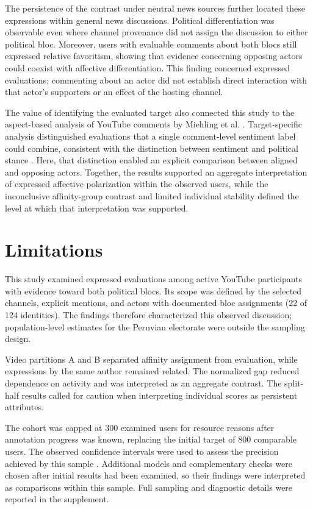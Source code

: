 \documentclass[conference,letterpaper]{IEEEtran}
\begin{document}
The persistence of the contrast under neutral news sources further located these expressions within general news discussions. Political differentiation was observable even where channel provenance did not assign the discussion to either political bloc. Moreover, users with evaluable comments about both blocs still expressed relative favoritism, showing that evidence concerning opposing actors could coexist with affective differentiation. This finding concerned expressed evaluations; commenting about an actor did not establish direct interaction with that actor's supporters or an effect of the hosting channel.

The value of identifying the evaluated target also connected this study to the aspect-based analysis of YouTube comments by Miehling et al. \cite{Miehling2025}. Target-specific analysis distinguished evaluations that a single comment-level sentiment label could combine, consistent with the distinction between sentiment and political stance \cite{BestvaterMonroe2023}. Here, that distinction enabled an explicit comparison between aligned and opposing actors. Together, the results supported an aggregate interpretation of expressed affective polarization within the observed users, while the inconclusive affinity-group contrast and limited individual stability defined the level at which that interpretation was supported.

\section{Limitations}

This study examined expressed evaluations among active YouTube participants with evidence toward both political blocs. Its scope was defined by the selected channels, explicit mentions, and actors with documented bloc assignments (22 of 124 identities). The findings therefore characterized this observed discussion; population-level estimates for the Peruvian electorate were outside the sampling design.

Video partitions A and B separated affinity assignment from evaluation, while expressions by the same author remained related. The normalized gap reduced dependence on activity and was interpreted as an aggregate contrast. The split-half results called for caution when interpreting individual scores as persistent attributes.

The cohort was capped at 300 examined users for resource reasons after annotation progress was known, replacing the initial target of 800 comparable users. The observed confidence intervals were used to assess the precision achieved by this sample \cite{lakens2022sample}. Additional models and complementary checks were chosen after initial results had been examined, so their findings were interpreted as comparisons within this sample. Full sampling and diagnostic details were reported in the supplement.
\end{document}
